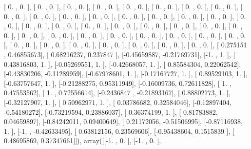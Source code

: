 \documentclass{article}
\begin{document}
       [ 0.        ,  0.        ],
       [ 0.        ,  0.        ],
       [ 0.        ,  0.        ],
       [ 0.        ,  0.        ],
       [ 0.        ,  0.        ],
       [ 0.        ,  0.        ],
       [ 0.        ,  0.        ],
       [ 0.        ,  0.        ],
       [ 0.        ,  0.        ],
       [ 0.        ,  0.        ],
       [ 0.        ,  0.        ],
       [ 0.        ,  0.        ],
       [ 0.        ,  0.        ],
       [ 0.        ,  0.        ],
       [ 0.        ,  0.        ],
       [ 0.        ,  0.        ],
       [ 0.        ,  0.        ],
       [ 0.        ,  0.        ],
       [ 0.        ,  0.        ],
       [ 0.        ,  0.        ],
       [ 0.        ,  0.        ],
       [ 0.        ,  0.        ],
       [ 0.        ,  0.        ],
       [ 0.        ,  0.        ],
       [ 0.        ,  0.        ],
       [ 0.        ,  0.        ],
       [ 0.        ,  0.        ],
       [ 0.        ,  0.        ],
       [ 0.        ,  0.        ],
       [ 0.        ,  0.        ],
       [ 0.        ,  0.        ],
       [ 0.        ,  0.        ],
       [ 0.        ,  0.        ],
       [ 0.        ,  0.        ],
       [ 0.        ,  0.        ],
       [ 0.        ,  0.        ],
       [ 0.        ,  0.        ],
       [ 0.        ,  0.        ],
       [ 0.        ,  0.        ],
       [ 0.        ,  0.        ],
       [ 0.275151  ,  0.46855673],
       [ 0.68216237,  0.237847  ],
       [-0.45659887, -0.21769731],
       [-1.        ,  1.        ],
       [ 0.43816803,  1.        ],
       [-0.05269551,  1.        ],
       [-0.42668057,  1.        ],
       [ 0.85584304,  0.22062542],
       [-0.43830206, -0.11289959],
       [-0.67978601,  1.        ],
       [-0.17167727,  1.        ],
       [ 0.89529103,  1.        ],
       [-0.63757647,  1.        ],
       [-0.21288275,  0.95311949],
       [-0.16009736,  0.72611828],
       [ 1.        ,  0.47553562],
       [ 1.        ,  0.72556614],
       [-0.2436847 , -0.21893167],
       [ 0.88802773,  1.        ],
       [-0.32127907,  1.        ],
       [ 0.50962971,  1.        ],
       [ 0.03786682,  0.32584046],
       [-0.12897404, -0.54180272],
       [-0.73219594,  0.23886037],
       [ 0.36374199,  1.        ],
       [ 0.81783882,  0.04659897],
       [-0.84242011,  0.09400649],
       [ 0.21172056, -0.51506995],
       [-0.87116938,  1.        ],
       [-1.        , -0.42633495],
       [ 0.63812156,  0.23569606],
       [-0.95438604,  0.1515839 ],
       [ 0.48695869,  0.37347661]]), array([[-1.        ,  0.        ],
       [-1.        ,  0.        ],
\end{document}
